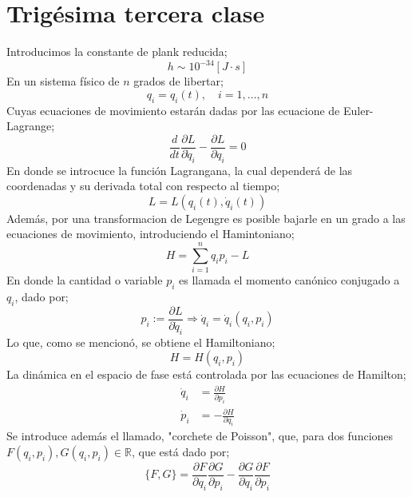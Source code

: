 \documentclass[../main.tex]{subfiles}
\begin{document}
\section{Trigésima tercera clase}
Introducimos la constante de plank reducida;
\begin{equation}
  h \sim 10^{-34}[J\cdot s]
 \end{equation}
 En un sistema físico de $n$ grados de libertar;
 \begin{equation}
   q_i = q_i(t), \quad i=1,\dots ,n
  \end{equation}
  Cuyas ecuaciones de movimiento estarán dadas por las ecuacione de Euler-Lagrange;
  \begin{equation}
    \frac{d}{dt} \frac{\partial L}{\partial \dot{q}_i} - \frac{\partial L}{\partial q_i}=0
   \end{equation}
En donde se introcuce la función Lagrangana, la cual dependerá de las coordenadas y su derivada total con respecto al tiempo;
\begin{equation}
  L = L (q_i(t),\dot{q}_i(t))
 \end{equation}
 Además, por una transformacion de Legengre es posible bajarle en un grado a las ecuaciones de movimiento, introduciendo el Hamintoniano;
 \begin{equation}
   H = \sum_{i=1}^n q_i p_i - L
  \end{equation}
  En donde la cantidad o variable $p_i$ es llamada el momento canónico conjugado a $q_i$, dado por;
  \begin{equation}
    p_i := \frac{\partial L}{\partial \dot{q}_i}\Rightarrow \dot{q}_i = \dot{q}_i(q_i,p_i)
   \end{equation}
Lo que, como se mencionó, se obtiene el Hamiltoniano;
\begin{equation}
  H = H(q_i,p_i)
 \end{equation}
 La dinámica en el espacio de fase está controlada por las ecuaciones de Hamilton;
 \begin{align}
   \dot{q}_i & = \frac{\partial H}{\partial p_i} \\
   \dot{p}_i & = -\frac{\partial H}{\partial q_i}
 \end{align}
 Se introduce además el llamado, "corchete de Poisson", que, para dos funciones $F(q_i,p_i),G(q_i,p_i)\in \mathbb{R}$, que está dado por;
 \begin{equation}
   \{F,G\} = \frac{\partial F}{\partial q_i} \frac{\partial G}{\partial p_i} - \frac{\partial G}{\partial q_i} \frac{\partial F}{\partial p_i}
  \end{equation}
\end{document}
